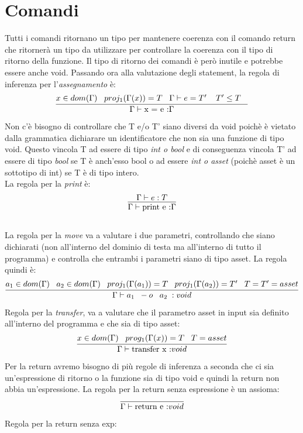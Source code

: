 \documentclass[12pt, a4paper]{report}
\begin{document}
\section{Comandi}
Tutti i comandi ritornano un tipo per mantenere coerenza con il comando return che ritornerà un tipo da utilizzare per controllare la coerenza con il tipo di ritorno della funzione. Il tipo di ritorno dei comandi è però inutile e potrebbe essere anche void.
Passando ora alla valutazione degli statement, la regola di inferenza per l'\emph{assegnamento} è: \\
\[\infer{\Gamma \vdash \mbox{x = e :} \Gamma}{x \in dom(\Gamma) \;\;\; proj_1(\Gamma(x))=T \;\;\; \Gamma \vdash e= T' \;\;\;\; T'\leq T \;\;\; }\]
Non c'è bisogno di controllare che T e/o T' siano diversi da void poichè è vietato dalla grammatica dichiarare un identificatore che non sia una funzione di tipo void. Questo vincola T ad essere di tipo \emph{int o bool} e di conseguenza vincola T' ad essere di tipo \emph{bool} se T è anch'esso bool o ad essere \emph{int o asset} (poichè asset è un sottotipo di int) se T è di tipo intero. \\
La regola per la \emph{print} è:
\[\infer{\Gamma \vdash \mbox{print e :} \Gamma}{\Gamma \vdash e: T}\]\\
La regola per la \emph{move} va a valutare i due parametri, controllando che siano dichiarati (non all'interno del dominio di testa ma all'interno di tutto il programma) e controlla che entrambi i parametri siano di tipo asset. La regola quindi è:\\
\[
\infer{\Gamma \vdash a_1\;\; -o\;\;\; a_2\; : void}{a_1 \in dom(\Gamma) \;\;\; a_2 \in dom(\Gamma) \;\;\;proj_1(\Gamma(a_1)) = T \;\;\; proj_1(\Gamma(a_2)) = T' \;\;\; T=T'=asset}
    \]
Regola per la \emph{transfer}, va a valutare che il parametro asset in input sia definito all'interno del programma e che sia di tipo asset:\\
\[\infer{\Gamma \vdash \mbox{transfer x :} void}{x \in dom(\Gamma) \;\;\; prog_1(\Gamma(x))=T \;\;\; T=asset}\]
Per la return avremo bisogno di più regole di inferenza a seconda che ci sia un'espressione di ritorno o la funzione sia di tipo void e quindi la return non abbia un'espressione.
La regola per la return senza espressione è un assioma:\\
\[\infer{\Gamma \vdash \mbox{return e :} void}{}\]
Regola per la return senza exp:\\
\\
\end{document}
